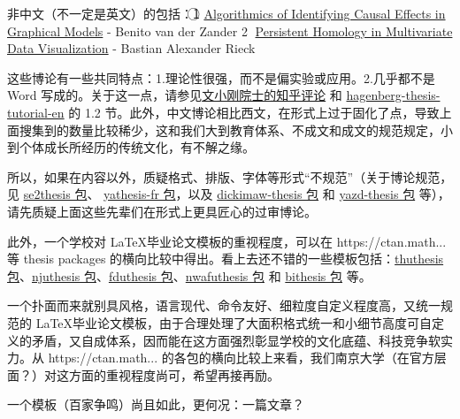 {\two} 非中文（不一定是英文）的包括：\textcircled{1} \href{https://www.benibela.de/bin/others/phd.pdf}{Algorithmics of Identifying Causal Effects in Graphical Models} - Benito van der Zander \textcircled{2} \href{https://bastian.rieck.me/research/Dissertation_Rieck_2017.pdf}{Persistent Homology in Multivariate Data Visualization} - Bastian Alexander Rieck

这些博论有一些共同特点：1.理论性很强，而不是偏实验或应用。2.几乎都不是 Word 写成的。关于这一点，请参见\href{https://www.zhihu.com/question/615700757/answer/3165877949}{文小刚院士的知乎评论} 和 \href{https://mirrors.mit.edu/CTAN/macros/latex/contrib/hagenberg-thesis/doc/hagenberg-thesis-tutorial-en.pdf}{hagenberg-thesis-tutorial-en} 的 1.2 节。此外，中文博论相比西文，在形式上过于固化了点，导致上面搜集到的数量比较稀少，这和我们大到教育体系、不成文和成文的规范规定，小到个体成长所经历的传统文化，有不解之缘。

所以，如果在内容以外，质疑格式、排版、字体等形式“不规范”（关于博论规范，见 \href{https://ctan.math.washington.edu/tex-archive/macros/latex/contrib/se2thesis/se2thesis.pdf}{se2thesis 包}、 \href{https://ctan.math.illinois.edu/macros/latex/contrib/yathesis/doc/yathesis-fr.pdf}{yathesis-fr 包}，以及 \href{https://ctan.math.utah.edu/tex-archive/info/dickimaw/dickimaw-thesis.pdf}{dickimaw-thesis 包} 和 \href{https://ctan.math.washington.edu/tex-archive/macros/xetex/latex/yazd-thesis/yazd-thesis.pdf}{yazd-thesis 包} 等），请先质疑上面这些先辈们在形式上更具匠心的过审博论。

此外，一个学校对 \LaTeX 毕业论文模板的重视程度，可以在 https://ctan.math... 等 thesis packages 的横向比较中得出。看上去还不错的一些模板包括：\href{https://ctan.math.utah.edu/ctan/tex-archive/macros/latex/contrib/thuthesis/thuthesis.pdf}{thuthesis 包}、\href{https://ctan.math.illinois.edu/macros/unicodetex/latex/njuthesis/njuthesis.pdf}{njuthesis 包}、\href{https://ctan.math.illinois.edu/macros/latex/contrib/fduthesis/fduthesis.pdf}{fduthesis 包}、\href{https://ctan.math.utah.edu/ctan/tex-archive/macros/unicodetex/latex/nwafuthesis/nwafuthesis.pdf}{nwafuthesis 包} 和 \href{https://ctan.math.illinois.edu/macros/unicodetex/latex/njuthesis/njuthesis.pdf}{bithesis 包} 等。

一个扑面而来就别具风格，语言现代、命令友好、细粒度自定义程度高，又统一规范的 \LaTeX 毕业论文模板，由于合理处理了大面积格式统一和小细节高度可自定义的矛盾，又自成体系，因而能在这方面强烈彰显学校的文化底蕴、科技竞争软实力。从 https://ctan.math... 的各包的横向比较上来看，我们南京大学（在官方层面？）对这方面的重视程度尚可，希望再接再励。

一个模板（百家争鸣）尚且如此，更何况：一篇文章？